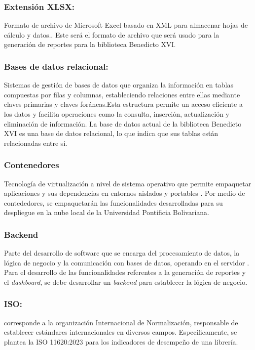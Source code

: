 \documentclass[spanish]{ieee_upb}
\begin{document}
   \subsubsection{Extensión XLSX: } Formato de archivo de Microsoft Excel basado en XML para almacenar hojas de cálculo y datos.\cite{microsoft_xlsx_2019}. Este será el formato de archivo que será usado para la generación de reportes para la biblioteca Benedicto XVI.

  \subsubsection{Bases de datos relacional: } Sistemas de gestión de bases de datos que organiza la información en tablas compuestas por filas y columnas, estableciendo relaciones entre ellas mediante claves primarias y claves foráneas\cite{ibm_relational_databases}.Esta estructura permite un acceso eficiente a los datos y facilita operaciones como la consulta, inserción, actualización y eliminación de información\cite{ionos_relational_databases}.   La base de datos actual de la biblioteca Benedicto XVI es una base de datos relacional, lo que indica que sus tablas están relacionadas entre sí.

  \subsubsection{Contenedores} Tecnología de virtualización a nivel de sistema operativo que permite empaquetar aplicaciones y sus dependencias en entornos aislados y portables \cite{matthias2014docker}. Por medio de contededores, se empaquetarán las funcionalidades desarrolladas para su despliegue en la nube local de la Universidad Pontificia Bolivariana.

  \subsubsection{Backend} Parte del desarrollo de software que se encarga del procesamiento de datos, la lógica de negocio y la comunicación con bases de datos, operando en el servidor \cite{ibm_backend_2020}. Para el desarrollo de las funcionalidades referentes a la generación de reportes y el \textit{dashboard}, se debe desarrollar un \textit{backend} para establecer la lógica de negocio.

  \subsubsection{ISO: } corresponde a la  organización Internacional de Normalización, responsable de establecer estándares internacionales en diversos campos\cite{iso_standards_2019}. Específicamente, se plantea la ISO 11620:2023 para los indicadores de desempeño de una librería\cite{iso11620_2023Library}.  
\end{document}
